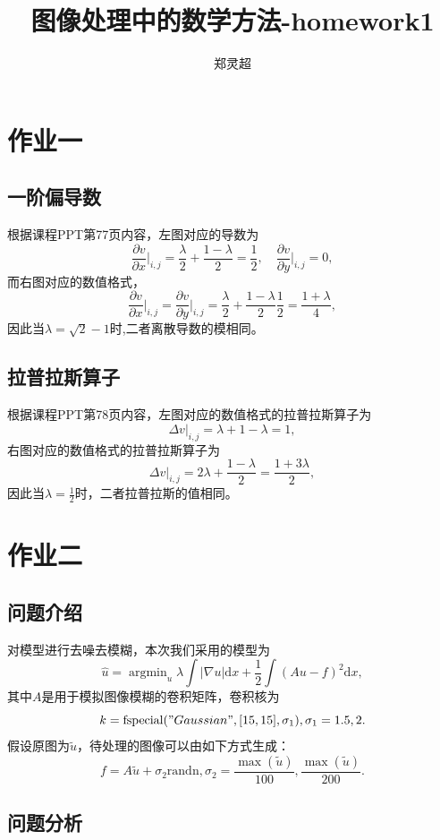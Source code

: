 \documentclass[a4paper,  11pt]{ctexart}
\newcommand\pd[2]{\dfrac{\partial {#1}}{\partial {#2}}}
\begin{document}
\title{图像处理中的数学方法-homework1}
\author{郑灵超}
\maketitle

\section{作业一}
\subsection{一阶偏导数}
根据课程PPT第77页内容，左图对应的导数为
\[
\pd{v}{x}\Big|_{i,j} = \frac{\lambda}{2} + 
\frac{1-\lambda}{2}=\frac{1}{2},\quad 
\pd{v}{y}\Big|_{i,j}=0,
\]
而右图对应的数值格式，
\[
\pd{v}{x}\Big|_{i,j}=\pd{v}{y}\Big|_{i,j}=
\frac{\lambda}{2}+\frac{1-\lambda}{2}\frac{1}{2}=\frac{1+\lambda}{4},
\]
因此当$\lambda=\sqrt{2}-1$时,二者离散导数的模相同。
\subsection{拉普拉斯算子}
根据课程PPT第78页内容，左图对应的数值格式的拉普拉斯算子为
\[
\Delta v|_{i,j}= \lambda + 1-\lambda = 1,
\]
右图对应的数值格式的拉普拉斯算子为
\[
\Delta v|_{i,j}= 2\lambda+\frac{1-\lambda}{2}=
\frac{1+3\lambda}{2},
\]
因此当$\lambda=\frac{1}{2}$时，二者拉普拉斯的值相同。
\section{作业二}
\subsection{问题介绍}
对模型进行去噪去模糊，本次我们采用的模型为 
\begin{equation}
    \label{eq:model}
    \hat{u}=\mathop{\arg\min}_u \lambda \int \vert \nabla u \vert
    \text{d} x + \frac
    12\int(Au-f)^2 \text{d}x,
\end{equation}
其中$A$是用于模拟图像模糊的卷积矩阵，卷积核为
\[
k = \text{fspecial}("Gaussian",[15,15],\sigma_1),\sigma_1=1.5,2.
\]
假设原图为$\tilde{u}$，待处理的图像可以由如下方式生成：
\[
  f =
  A\tilde{u}+\sigma_2\text{randn},\sigma_2=\frac{\max(\tilde{u})}{100}
  ,\frac{\max(\tilde{u})}{200}.
\]

\subsection{问题分析}
\end{document}

